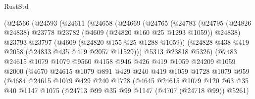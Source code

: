 \begin{lexlean}{RustStd}
\begin{coremodule}
                      (@24566
                        (@24593
                          (@24611
                            (@24658
                              (@24669
                                (@24765
                                  (@24783
                                    (@24795
                                      (@24826 @24838)
                                      @23778
                                      @23782
                                      (@4609 (@24820 @160 @25 @1293 @1059))
                                      @24838)
                                    @23793
                                    @23797
                                    (@4609 (@24820 @155 @25 @1288 @1059))
                                    (@24828 @438 @419 @2058 (@24833 @435 @419 @2057 @11529)))
                                  @5313
                                  @23818
                                  @5326)
                                (@7483
                                  @24615
                                  @1079
                                  @1079
                                  @9560
                                  @4158
                                  @946
                                  @426
                                  @419
                                  @1059
                                  @24209
                                  @1059
                                  @2000
                                  (@4670
                                    @24615
                                    @1079
                                    @891
                                    @429
                                    @240
                                    @419
                                    @1059
                                    @1728
                                    @1079
                                    @959
                                    (@4684
                                      @24615
                                      @1079
                                      @429
                                      @240
                                      @1728
                                      (@4645
                                        @24615
                                        @1079
                                        @120
                                        @63
                                        @35
                                        @40
                                        @1147
                                        @1075
                                        (@24713 @99 @35 @99 @1147 (@4707 (@24718 @99)) @5261)

\end{coremodule}
\end{lexlean}
